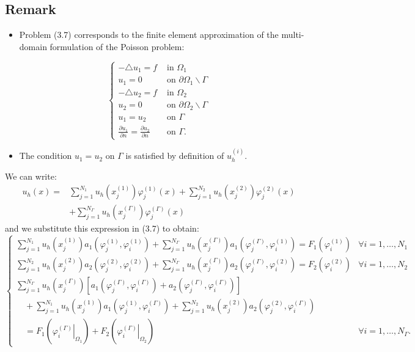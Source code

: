 \documentclass[11pt]{book}
\begin{document}
\subsection*{Remark}
\begin{itemize}
  \item Problem (3.7) corresponds to the finite element approximation of the multi-domain formulation of the Poisson problem:
\end{itemize}
$$
\begin{cases}-\triangle u_{1}=f & \text { in } \Omega_{1} \\ u_{1}=0 & \text { on } \partial \Omega_{1} \backslash \Gamma \\ -\triangle u_{2}=f & \text { in } \Omega_{2} \\ u_{2}=0 & \text { on } \partial \Omega_{2} \backslash \Gamma \\ u_{1}=u_{2} & \text { on } \Gamma \\ \frac{\partial u_{1}}{\partial n}=\frac{\partial u_{2}}{\partial n} & \text { on } \Gamma .\end{cases}
$$
\begin{itemize}
  \item The condition $u_{1}=u_{2}$ on $\Gamma$ is satisfied by definition of $u_{h}^{(i)}$.
\end{itemize}
We can write:
$$
\begin{aligned}
u_{h}(x)= & \sum_{j=1}^{N_{1}} u_{h}\left(x_{j}^{(1)}\right) \varphi_{j}^{(1)}(x)+\sum_{j=1}^{N_{2}} u_{h}\left(x_{j}^{(2)}\right) \varphi_{j}^{(2)}(x) \\
& +\sum_{j=1}^{N_{\Gamma}} u_{h}\left(x_{j}^{(\Gamma)}\right) \varphi_{j}^{(\Gamma)}(x)
\end{aligned}
$$
and we substitute this expression in (3.7) to obtain:
$$
\begin{cases}\sum_{j=1}^{N_{1}} u_{h}\left(x_{j}^{(1)}\right) a_{1}\left(\varphi_{j}^{(1)}, \varphi_{i}^{(1)}\right)+\sum_{j=1}^{N_{\Gamma}} u_{h}\left(x_{j}^{(\Gamma)}\right) a_{1}\left(\varphi_{j}^{(\Gamma)}, \varphi_{i}^{(1)}\right)=F_{1}\left(\varphi_{i}^{(1)}\right) & \forall i=1, \ldots, N_{1} \\ \sum_{j=1}^{N_{2}} u_{h}\left(x_{j}^{(2)}\right) a_{2}\left(\varphi_{j}^{(2)}, \varphi_{i}^{(2)}\right)+\sum_{j=1}^{N_{\Gamma}} u_{h}\left(x_{j}^{(\Gamma)}\right) a_{2}\left(\varphi_{j}^{(\Gamma)}, \varphi_{i}^{(2)}\right)=F_{2}\left(\varphi_{i}^{(2)}\right) & \forall i=1, \ldots, N_{2} \\ \sum_{j=1}^{N_{\Gamma}} u_{h}\left(x_{j}^{(\Gamma)}\right)\left[a_{1}\left(\varphi_{j}^{(\Gamma)}, \varphi_{i}^{(\Gamma)}\right)+a_{2}\left(\varphi_{j}^{(\Gamma)}, \varphi_{i}^{(\Gamma)}\right)\right] & \\ \quad+\sum_{j=1}^{N_{1}} u_{h}\left(x_{j}^{(1)}\right) a_{1}\left(\varphi_{j}^{(1)}, \varphi_{i}^{(\Gamma)}\right)+\sum_{j=1}^{N_{2}} u_{h}\left(x_{j}^{(2)}\right) a_{2}\left(\varphi_{j}^{(2)}, \varphi_{i}^{(\Gamma)}\right) & \\ \quad=F_{1}\left(\left.\varphi_{i}^{(\Gamma)}\right|_{\Omega_{1}}\right)+F_{2}\left(\left.\varphi_{i}^{(\Gamma)}\right|_{\Omega_{2}}\right) & \forall i=1, \ldots, N_{\Gamma} .\end{cases}
$$
\end{document}
